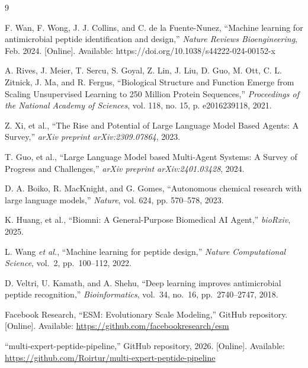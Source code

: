 \begin{thebibliography}{9}

F. Wan, F. Wong, J. J. Collins, and C. de la Fuente-Nunez, ``Machine learning for antimicrobial peptide identification and design,'' \textit{Nature Reviews Bioengineering}, Feb. 2024. [Online]. Available: https://doi.org/10.1038/s44222-024-00152-x

A. Rives, J. Meier, T. Sercu, S. Goyal, Z. Lin, J. Liu, D. Guo, M. Ott, C. L. Zitnick, J. Ma, and R. Fergus, ``Biological Structure and Function Emerge from Scaling Unsupervised Learning to 250 Million Protein Sequences,'' \textit{Proceedings of the National Academy of Sciences}, vol. 118, no. 15, p. e2016239118, 2021.

Z. Xi, et al., ``The Rise and Potential of Large Language Model Based Agents: A Survey,'' \textit{arXiv preprint arXiv:2309.07864}, 2023.

T. Guo, et al., ``Large Language Model based Multi-Agent Systems: A Survey of Progress and Challenges,'' \textit{arXiv preprint arXiv:2401.03428}, 2024.

D. A. Boiko, R. MacKnight, and G. Gomes, ``Autonomous chemical research with large language models,'' \textit{Nature}, vol. 624, pp. 570--578, 2023.

K. Huang, et al., ``Biomni: A General-Purpose Biomedical AI Agent,'' \textit{bioRxiv}, 2025.

L. Wang \textit{et al.}, ``Machine learning for peptide design,'' \textit{Nature Computational Science}, vol.~2, pp.~100--112, 2022.

D. Veltri, U. Kamath, and A. Shehu, ``Deep learning improves antimicrobial peptide recognition,'' \textit{Bioinformatics}, vol.~34, no.~16, pp.~2740--2747, 2018.

Facebook Research,
``ESM: Evolutionary Scale Modeling,'' GitHub repository. [Online]. Available: \url{https://github.com/facebookresearch/esm}

``multi-expert-peptide-pipeline,'' GitHub repository, 2026. [Online]. Available: \url{https://github.com/Roirtur/multi-expert-peptide-pipeline}

\end{thebibliography}
\newpage